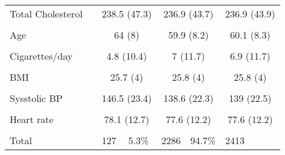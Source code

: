 \documentclass{article}\usepackage[]{graphicx}\usepackage[]{color}
\begin{document}
\begin{table}[ht]
\begin{tabular}{llllllll}
Total Cholesterol &  & \multicolumn{2}{c}{238.5 (47.3)} & \multicolumn{2}{c}{236.9 (43.7)} & \multicolumn{2}{c}{236.9 (43.9)}\\
 &  &  &  &  &  &  & \\
Age &  & \multicolumn{2}{c}{64 (8)} & \multicolumn{2}{c}{59.9 (8.2)} & \multicolumn{2}{c}{60.1 (8.3)}\\
 &  &  &  &  &  &  & \\
Cigarettes/day &  & \multicolumn{2}{c}{4.8 (10.4)} & \multicolumn{2}{c}{7 (11.7)} & \multicolumn{2}{c}{6.9 (11.7)}\\
 &  &  &  &  &  &  & \\
BMI &  & \multicolumn{2}{c}{25.7 (4)} & \multicolumn{2}{c}{25.8 (4)} & \multicolumn{2}{c}{25.8 (4)}\\
 &  &  &  &  &  &  & \\
Sysstolic BP &  & \multicolumn{2}{c}{146.5 (23.4)} & \multicolumn{2}{c}{138.6 (22.3)} & \multicolumn{2}{c}{139 (22.5)}\\
 &  &  &  &  &  &  & \\
Heart rate &  & \multicolumn{2}{c}{78.1 (12.7)} & \multicolumn{2}{c}{77.6 (12.2)} & \multicolumn{2}{c}{77.6 (12.2)}\\
 &  &  &  &  &  &  & \\
  \hline
Total &  & 127 & 5.3\% & 2286 & 94.7\% & 2413 &  \\ 
   \hline
\end{tabular}
\end{table}
\end{document}
